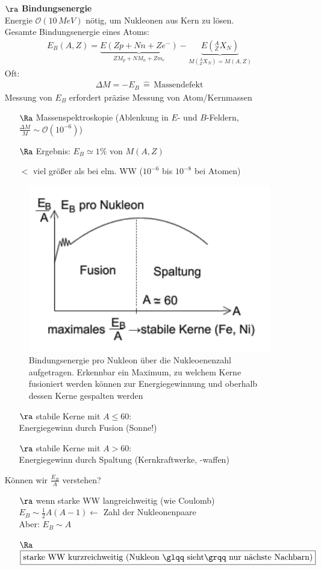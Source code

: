 \begin{itemize}
\item[$\ra$] \textbf{Bindungsenergie}\\
Energie $\mathcal{O}(10\,MeV)$ nötig, um Nukleonen aus Kern zu lösen.\\
Gesamte Bindungsenergie eines Atoms:
\begin{align}
E_B(A,Z)=\underbrace{E(Zp+Nn+Ze^-)}_{ZM_p+NM_n+Zm_e}-\underbrace{E(^A_Z X_N)}_{M(^A_Z X_N)=M(A,Z)}
\end{align}
Oft:
\begin{align}
\boxed{\Delta M=-E_B \,\widehat{=}\, \text{Massendefekt}}
\end{align}
Messung von $E_B$ erfordert präzise Messung von Atom/Kernmassen
\begin{itemize}
\item[$\Ra$] Massenspektroskopie (Ablenkung in $E$- und $B$-Feldern, $\frac{\Delta M}{M}\sim \mathcal{O}(10^{-6})$)
\item[$\Ra$] Ergebnis: $E_B \simeq 1\%$ von $M(A,Z)$
\item[$\lt$] viel größer als bei elm. WW ($10^{-6}$ bis $10^{-8}$ bei Atomen)
\end{itemize}
\begin{figure}[!ht]
	\centering
	\includegraphics[width=.5\textwidth]{imgs/ep5-fig-4-6.pdf}
	\caption{Bindungsenergie pro Nukleon über die Nukleoenenzahl aufgetragen. Erkennbar ein Maximum, zu welchem Kerne fusioniert werden können zur Energiegewinnung und oberhalb dessen Kerne gespalten werden \label{fig:4.6}}
	\end{figure}
\begin{itemize}
\item[$\ra$] stabile Kerne mit $A\leq 60$:\\
Energiegewinn durch Fusion (Sonne!)
\item[$\ra$] stabile Kerne mit $A>60$:\\
Energiegewinn durch Spaltung (Kernkraftwerke, -waffen)
\end{itemize}
Können wir $\frac{E_B}{A}$ verstehen?
\begin{itemize}
\item[$\ra$] wenn starke WW langreichweitig (wie Coulomb)\\
$E_B\sim \frac{1}{2}A(A-1)\leftarrow$ Zahl der Nukleonenpaare\\
Aber: $E_B\sim A$
\item[$\Ra$] $\boxed{\text{starke WW kurzreichweitig (Nukleon \glqq sieht\grqq nur nächste Nachbarn)}}$
\end{itemize}
\end{itemize}

